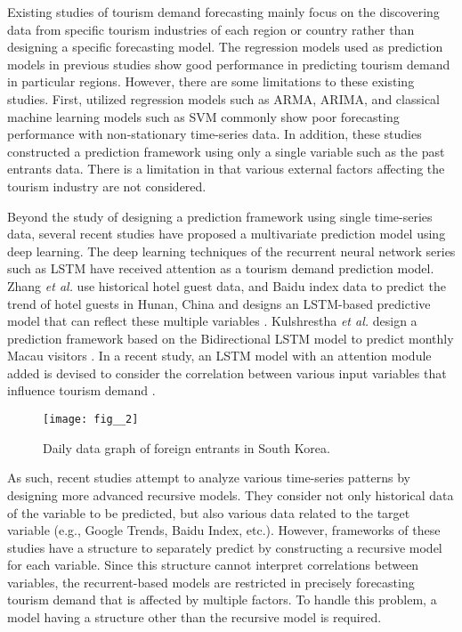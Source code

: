 \documentclass[conference]{IEEEtran}
\begin{document}
Existing studies of tourism demand forecasting mainly focus on the discovering data from specific tourism industries of each region or country rather than designing a specific forecasting model. The regression models used as prediction models in previous studies show good performance in predicting tourism demand in particular regions. However, there are some limitations to these existing studies. First, utilized regression models such as ARMA, ARIMA, and classical machine learning models such as SVM commonly show poor forecasting performance with non-stationary time-series data. In addition, these studies constructed a prediction framework using only a single variable such as the past entrants data. There is a limitation in that various external factors affecting the tourism industry are not considered.

Beyond the study of designing a prediction framework using single time-series data, several recent studies have proposed a multivariate prediction model using deep learning. The deep learning techniques of the recurrent neural network series such as LSTM \cite{hochreiter1997long} have received attention as a tourism demand prediction model. Zhang \textit{et al.} use historical hotel guest data, and Baidu index data to predict the trend of hotel guests in Hunan, China and designs an LSTM-based predictive model that can reflect these multiple variables \cite{zhang2019forecasting}. Kulshrestha \textit{et al.} design a prediction framework based on the Bidirectional LSTM model to predict monthly Macau visitors \cite{kulshrestha2020bayesian}. In a recent study, an LSTM model with an attention module \cite{vaswani2017attention} added is devised to consider the correlation between various input variables that influence tourism demand \cite{law2019tourism}.

\begin{figure*}[t]
\begin{center}
\texttt{[image: fig\_\_2]}
\end{center}
   \caption{Daily data graph of foreign entrants in South Korea.}
\label{fig:fig2}
\end{figure*}

As such, recent studies attempt to analyze various time-series patterns by designing more advanced recursive models. They consider not only historical data of the variable to be predicted, but also various data related to the target variable (e.g., Google Trends, Baidu Index, etc.). However, frameworks of these studies have a structure to separately predict by constructing a recursive model for each variable. 
Since this structure cannot interpret correlations between variables, the recurrent-based models are restricted in precisely forecasting tourism demand that is affected by multiple factors. To handle this problem, a model having a structure other than the recursive model is required.
\end{document}
